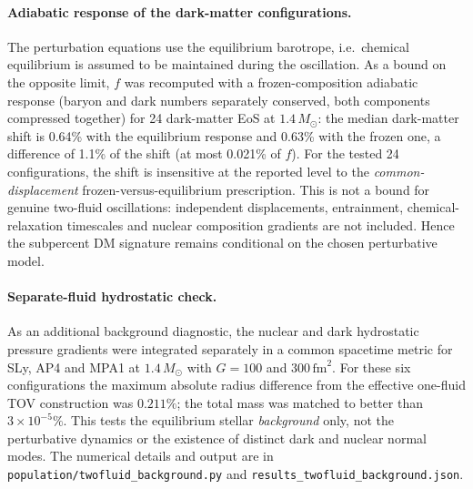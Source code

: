 \documentclass[11pt,a4paper]{article}
\newcommand{\Msun}{M_\odot}
\begin{document}
\paragraph{Adiabatic response of the dark-matter configurations.} The perturbation equations use the equilibrium barotrope, i.e.\ chemical equilibrium is assumed to be maintained during the oscillation. As a bound on the opposite limit, $f$ was recomputed with a frozen-composition adiabatic response (baryon and dark numbers separately conserved, both components compressed together) for 24 dark-matter EoS at $1.4\,\Msun$: the median dark-matter shift is 0.64\% with the equilibrium response and 0.63\% with the frozen one, a difference of 1.1\% of the shift (at most 0.021\% of $f$). For the tested 24 configurations, the shift is insensitive at the reported level to the \emph{common-displacement} frozen-versus-equilibrium prescription. This is not a bound for genuine two-fluid oscillations: independent displacements, entrainment, chemical-relaxation timescales and nuclear composition gradients are not included. Hence the subpercent DM signature remains conditional on the chosen perturbative model.
\paragraph{Separate-fluid hydrostatic check.} As an additional background diagnostic, the nuclear and dark hydrostatic pressure gradients were integrated separately in a common spacetime metric for SLy, AP4 and MPA1 at $1.4\,\Msun$ with $G=100$ and $300\,\mathrm{fm}^2$. For these six configurations the maximum absolute radius difference from the effective one-fluid TOV construction was $0.211\%$; the total mass was matched to better than $3\times10^{-5}\%$. This tests the equilibrium stellar \emph{background} only, not the perturbative dynamics or the existence of distinct dark and nuclear normal modes. The numerical details and output are in \texttt{population/twofluid\_background.py} and \texttt{results\_twofluid\_background.json}.\par
\end{document}
